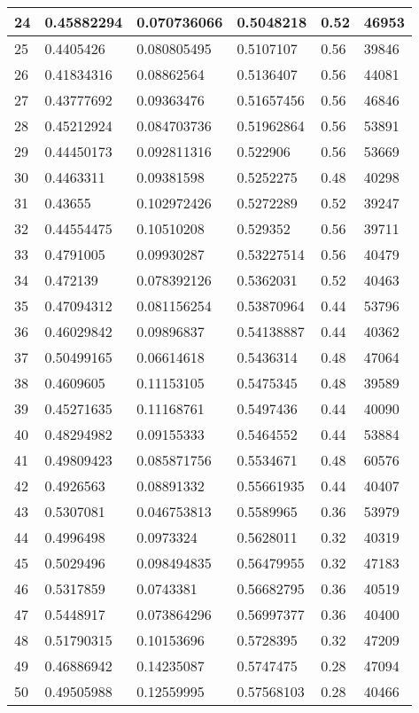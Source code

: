 \begin{longtable}{|l|l|l|l|l|l|}
24 & 0.45882294 & 0.070736066 & 0.5048218 & 0.52 & 46953 \\ \hline 
25 & 0.4405426 & 0.080805495 & 0.5107107 & 0.56 & 39846 \\ \hline 
26 & 0.41834316 & 0.08862564 & 0.5136407 & 0.56 & 44081 \\ \hline 
27 & 0.43777692 & 0.09363476 & 0.51657456 & 0.56 & 46846 \\ \hline 
28 & 0.45212924 & 0.084703736 & 0.51962864 & 0.56 & 53891 \\ \hline 
29 & 0.44450173 & 0.092811316 & 0.522906 & 0.56 & 53669 \\ \hline 
30 & 0.4463311 & 0.09381598 & 0.5252275 & 0.48 & 40298 \\ \hline 
31 & 0.43655 & 0.102972426 & 0.5272289 & 0.52 & 39247 \\ \hline 
32 & 0.44554475 & 0.10510208 & 0.529352 & 0.56 & 39711 \\ \hline 
33 & 0.4791005 & 0.09930287 & 0.53227514 & 0.56 & 40479 \\ \hline 
34 & 0.472139 & 0.078392126 & 0.5362031 & 0.52 & 40463 \\ \hline 
35 & 0.47094312 & 0.081156254 & 0.53870964 & 0.44 & 53796 \\ \hline 
36 & 0.46029842 & 0.09896837 & 0.54138887 & 0.44 & 40362 \\ \hline 
37 & 0.50499165 & 0.06614618 & 0.5436314 & 0.48 & 47064 \\ \hline 
38 & 0.4609605 & 0.11153105 & 0.5475345 & 0.48 & 39589 \\ \hline 
39 & 0.45271635 & 0.11168761 & 0.5497436 & 0.44 & 40090 \\ \hline 
40 & 0.48294982 & 0.09155333 & 0.5464552 & 0.44 & 53884 \\ \hline 
41 & 0.49809423 & 0.085871756 & 0.5534671 & 0.48 & 60576 \\ \hline 
42 & 0.4926563 & 0.08891332 & 0.55661935 & 0.44 & 40407 \\ \hline 
43 & 0.5307081 & 0.046753813 & 0.5589965 & 0.36 & 53979 \\ \hline 
44 & 0.4996498 & 0.0973324 & 0.5628011 & 0.32 & 40319 \\ \hline 
45 & 0.5029496 & 0.098494835 & 0.56479955 & 0.32 & 47183 \\ \hline 
46 & 0.5317859 & 0.0743381 & 0.56682795 & 0.36 & 40519 \\ \hline 
47 & 0.5448917 & 0.073864296 & 0.56997377 & 0.36 & 40400 \\ \hline 
48 & 0.51790315 & 0.10153696 & 0.5728395 & 0.32 & 47209 \\ \hline 
49 & 0.46886942 & 0.14235087 & 0.5747475 & 0.28 & 47094 \\ \hline 
50 & 0.49505988 & 0.12559995 & 0.57568103 & 0.28 & 40466 \\ \hline 
\end{longtable}